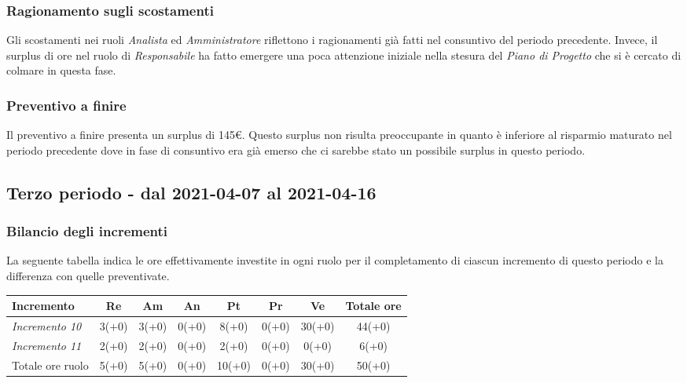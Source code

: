 {{{{{{{{{{		\subsubsection{Ragionamento sugli scostamenti}\label{ConsuntivoSecondoPeriodoDiProgettazioneDiDettaglioCodificaRagionamentoScostamenti}
		Gli scostamenti nei ruoli \textit{Analista} ed \textit{Amministratore} riflettono i ragionamenti già fatti nel consuntivo del periodo precedente.
		Invece, il surplus di ore nel ruolo di \textit{Responsabile} ha fatto emergere una poca attenzione iniziale nella stesura del \textit{Piano di Progetto} che si è cercato di colmare in questa fase.
		
		\subsubsection{Preventivo a finire}\label{ConsuntivoSecondoPeriodoDiProgettazioneDiDettaglioCodificaPreventivoFinire}
		Il preventivo a finire presenta un surplus di 145\euro. 
		Questo surplus non risulta preoccupante in quanto è inferiore al risparmio maturato nel periodo precedente dove in fase di consuntivo era già emerso che ci sarebbe stato un possibile surplus in questo periodo.
		
\subsection{Terzo periodo - dal 2021-04-07 al 2021-04-16 }\label{ConsuntivoTerzoPeriodoDiProgettazioneDiDettaglioCodifica}

\subsubsection{Bilancio degli incrementi}\label{ConsuntivoTerzoPeriodoDiProgettazioneDiDettaglioCodificaIncrementi}

La seguente tabella indica le ore effettivamente investite in ogni ruolo per il completamento di ciascun incremento di questo periodo e la differenza con quelle preventivate.

\quad
\def\tabularxcolumn#1{m{#1}}
{
	
	\begin{center}
		\renewcommand{\arraystretch}{1.4}
		\begin{tabularx}{\textwidth}{|X|c|c|c|c|c|c|c|}
			\hline
			\rowcolor{airforceblue}
			\textbf{Incremento} & \textbf{Re} & \textbf{Am} & \textbf{An} & \textbf{Pt} & \textbf{Pr} & \textbf{Ve} & \textbf{Totale ore}\\
			\hline
			\textit{Incremento 10} & 3(+0) & 3(+0) & 0(+0) & 8(+0) & 0(+0) & 30(+0) & 44(+0)\\
			\hline
			\textit{Incremento 11} & 2(+0) & 2(+0) & 0(+0) & 2(+0) & 0(+0) & 0(+0) & 6(+0)\\
			\hline
			Totale ore ruolo & 5(+0) & 5(+0) & 0(+0) & 10(+0) & 0(+0) & 30(+0) & 50(+0)\\
			\hline
		\end{tabularx}
	\end{center}

}}}}}}}}}}}
